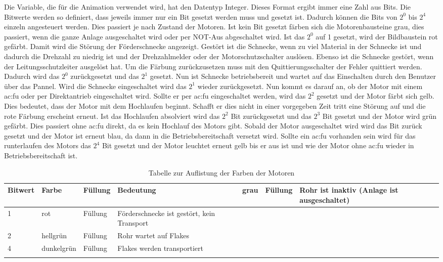 Die Variable, die für die Animation verwendet wird, hat den Datentyp Integer. Dieses Format ergibt immer eine Zahl aus Bits. Die Bitwerte werden so definiert, dass jeweils immer nur ein Bit gesetzt werden muss und gesetzt ist. Dadurch können die Bits von $2^{0}$ bis $2^{4}$ einzeln angesteuert werden. Dies passiert je nach Zustand der Motoren. Ist kein Bit gesetzt färben sich die Motorenbausteine grau, dies passiert, wenn die ganze Anlage ausgeschaltet wird oder per NOT-Aus abgeschaltet wird. Ist das $2^{0}$ auf 1 gesetzt, wird der Bildbaustein rot gefärbt. Damit wird die Störung der Förderschnecke angezeigt. Gestört ist die Schnecke, wenn zu viel Material in der Schnecke ist und dadurch die Drehzahl zu niedrig ist und der Drehzahlmelder oder der Motorschutzschalter auslösen. Ebenso ist die Schnecke gestört, wenn der Leitungsschutzleiter ausgelöst hat. Um die Färbung zurückzusetzen muss mit den Quittierungsschalter der Fehler quittiert werden. Dadurch wird das $2^{0}$ zurückgesetzt und das $2^{1}$ gesetzt. Nun ist Schnecke betriebsbereit und wartet auf das Einschalten durch den Benutzer über das Pannel. Wird die Schnecke eingeschaltet wird das $2^{1}$ wieder zurückgesetzt. Nun kommt es darauf an, ob der Motor mit einem \gls{ac:fu} oder per Direktantrieb eingeschaltet wird. Sollte er per \gls{ac:fu} eingeschaltet werden, wird das $2^{2}$ gesetzt und der Motor färbt sich gelb. Dies bedeutet, dass der Motor mit dem Hochlaufen beginnt. Schafft er dies nicht in einer vorgegeben Zeit tritt eine Störung auf und die rote Färbung erscheint erneut. Ist das Hochlaufen absolviert wird das $2^{2}$ Bit zurückgesetzt und das $2^{3}$ Bit gesetzt und der Motor wird grün gefärbt. Dies passiert ohne \gls{ac:fu} direkt, da es kein Hochlauf des Motors gibt. Sobald der Motor ausgeschaltet wird wird das Bit zurück gesetzt und der Motor ist erneut blau, da dann in die Betriebsbereitschaft versetzt wird. Sollte ein \gls{ac:fu} vorhanden sein wird für das runterlaufen des Motors das $2^{4}$ Bit gesetzt und der Motor leuchtet erneut gelb bis er aus ist und wie der Motor ohne \gls{ac:fu} wieder in Betriebsbereitschaft ist.  

\begin{longtable}{|C{2cm}|C{2cm}|C{2cm}|C{7.5cm}|}
	\hline \textbf{Bitwert} & \textbf{Farbe} & \textbf{Füllung} &  \textbf{Bedeutung}  \endhead
	 & grau & \colorbox{grua2}{\textcolor{grua2}{Füllung}} & Rohr ist inaktiv (Anlage ist ausgeschaltet)\\ 
	 & rot & \colorbox{rot}{\textcolor{rot}{Füllung}}& Förderschnecke ist gestört, kein Transport\\ 
	 & hellgrün & \colorbox{hellblau}{\textcolor{hellblau}{Füllung}} & Rohr wartet auf Flakes \\ 
	 & dunkelgrün & \colorbox{dunkelgren}{\textcolor{dunkelgren}{Füllung}}& Flakes werden transportiert \\ 
	\hline
	\caption{Tabelle zur Auflistung der Farben der Motoren \label{tab:Farben Rohre}}
\end{longtable} 

